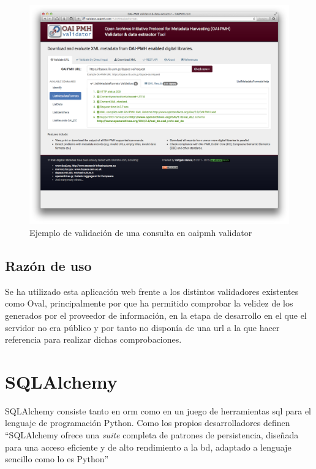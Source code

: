\begin{figure}[!htbp]
	\centering
	\includegraphics[scale=0.25]{fig/oaipmh_validator_example}
	\caption{Ejemplo de validación de una consulta en \acrshort{oaipmh} validator}
	\label{fig:oai_validator}
\end{figure}

\subsection{Razón de uso}

Se ha utilizado esta aplicación web frente a los distintos validadores existentes como Oval\cite{Oval}, principalmente por que ha permitido comprobar la velidez de los  generados por el proveedor de información, en la etapa de desarrollo en el que el servidor no era público y por tanto no disponía de una \acrshort{url} a la que hacer referencia para realizar dichas comprobaciones.

\section{SQLAlchemy}

SQLAlchemy\cite{SQLAlchemy} consiste tanto en \acrfull{orm} como en un juego de herramientas \acrshort{sql} para el lenguaje de programación Python. Como los propios desarrolladores definen ``SQLAlchemy ofrece una \textit{suite} completa de patrones de persistencia, diseñada para una acceso eficiente y de alto rendimiento a la \acrlong{bd}, adaptado a lenguaje sencillo como lo es Python''

